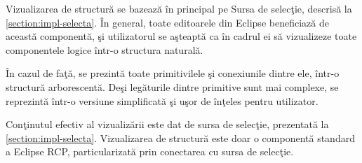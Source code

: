 Vizualizarea de structură se bazează în principal pe Sursa de selecţie, descrisă
la \ref{section:impl-selecta}. În general, toate editoarele din Eclipse
beneficiază de această componentă, şi utilizatorul se aşteaptă ca în cadrul ei
să vizualizeze toate componentele logice într-o structura naturală.

În cazul de faţă, se prezintă toate primitivilele şi conexiunile dintre ele,
într-o structură arborescentă. Deşi legăturile dintre primitive sunt mai
complexe, se reprezintă într-o versiune simplificată şi uşor de înţeles pentru
utilizator.

Conţinutul efectiv al vizualizării este dat de sursa de selecţie, prezentată la
\ref{section:impl-selecta}. Vizualizarea de structură este doar o componentă
standard a Eclipse RCP, particularizată prin conectarea cu sursa de selecţie.